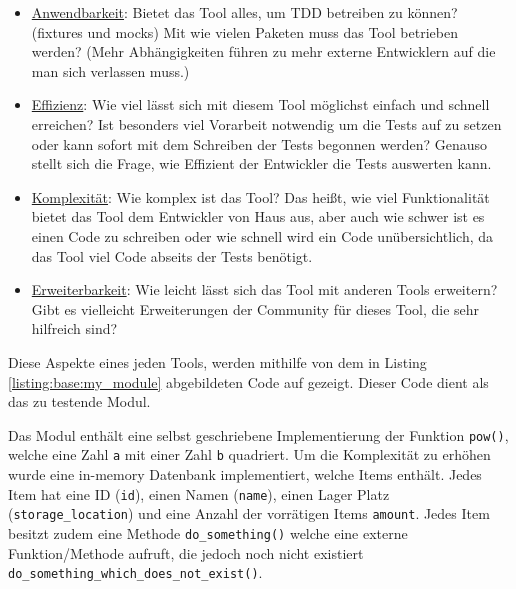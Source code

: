 \begin{itemize}
    \item \underline{Anwendbarkeit}:\newline
    Bietet das Tool alles, um TDD betreiben zu können? (\Glspl{fixture} und \Glspl{mock})
    Mit wie vielen Paketen muss das Tool betrieben werden? (Mehr Abhängigkeiten führen zu
    mehr externe Entwicklern auf die man sich verlassen muss.)
    
    \item \underline{Effizienz}:\newline
    Wie viel lässt sich mit diesem Tool möglichst einfach und
    schnell erreichen? Ist besonders viel Vorarbeit notwendig um die Tests
    auf zu setzen oder kann sofort mit dem Schreiben der Tests begonnen
    werden?
    \newline
    Genauso stellt sich die Frage, wie Effizient der Entwickler die Tests
    auswerten kann.
    
    \item \underline{Komplexität}:\newline
    Wie komplex ist das Tool? Das heißt, wie viel Funktionalität
    bietet das Tool dem Entwickler von Haus aus, aber auch wie schwer
    ist es einen Code zu schreiben oder wie schnell wird ein Code unübersichtlich, da
    das Tool viel Code abseits der Tests benötigt.
    
    \item \underline{Erweiterbarkeit}:\newline
    Wie leicht lässt sich das Tool mit anderen Tools erweitern?
    Gibt es vielleicht Erweiterungen der Community für dieses Tool, die sehr
    hilfreich sind?
\end{itemize}

Diese Aspekte eines jeden Tools, werden mithilfe von dem in Listing \ref{listing:base:my_module}
abgebildeten Code auf gezeigt. Dieser Code dient als das zu testende Modul.

Das Modul enthält eine selbst geschriebene Implementierung der Funktion \lstinline|pow()|,
welche eine Zahl \lstinline|a| mit einer Zahl \lstinline|b| quadriert. Um die Komplexität
zu erhöhen wurde eine in-memory Datenbank implementiert, welche Items enthält. Jedes Item 
hat eine ID (\lstinline|id|), einen Namen (\lstinline|name|), einen Lager Platz
(\lstinline|storage_location|) und eine Anzahl der vorrätigen Items \lstinline|amount|.
Jedes Item besitzt zudem eine Methode \lstinline|do_something()| welche eine externe
Funktion/Methode aufruft, die jedoch noch nicht existiert
\lstinline|do_something_which_does_not_exist()|.




